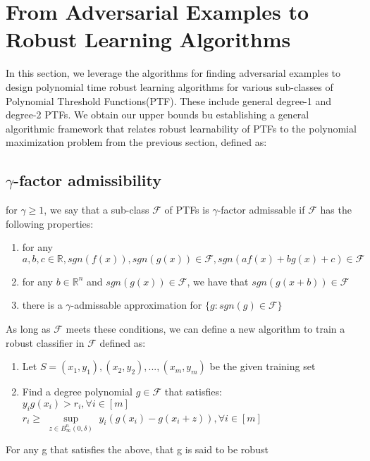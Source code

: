 \documentclass[12pt]{article}
\begin{document}
    \section{From Adversarial Examples to Robust Learning Algorithms}
    In this section, we leverage the algorithms for finding adversarial examples to design polynomial time robust learning algorithms for various sub-classes of Polynomial Threshold Functions(PTF). These include general degree-1 and degree-2 PTFs. We obtain our upper bounds bu establishing a general algorithmic framework that relates robust learnability of PTFs to the polynomial maximization problem from the previous section, defined as:
    
    \subsection{$\gamma$-factor admissibility}
    for $\gamma\ge1$, we say that a sub-class $\mathcal{F}$ of PTFs is $\gamma$-factor admissable if $\mathcal{F}$ has the following properties:
    \begin{enumerate}
        \item for any $a, b, c \in \mathbb{R}, sgn(f(x)), sgn(g(x))\in\mathcal{F}, sgn(af(x)+bg(x)+c)\in\mathcal{F}$
        \item for any $b\in\mathbb{R}^n$ and $sgn(g(x))\in\mathcal{F}$, we have that $sgn(g(x+b))\in\mathcal{F}$
        \item there is a $\gamma$-admissable approximation for $\{g:sgn(g)\in\mathcal{F}\}$
    \end{enumerate}
    
    As long as $\mathcal{F}$ meets these conditions, we can define a new algorithm to train a robust classifier in $\mathcal{F}$ defined as:
    \begin{enumerate}
        \item Let $S=(x_1,y_1), (x_2,y_2),...,(x_m,y_m)$ be the given training set
        \item Find a degree polynomial $g\in\mathcal{F}$ that satisfies: \\ 
        $y_{i}g(x_i)>r_i,\forall i\in [m]$ \\
        $r_i\ge$ \(\sup\limits_{z \in B^{n}_{\infty}(0, \delta)}\) $y_{i}(g(x_{i})-g(x_{i}+z)),\forall i\in [m]$
    \end{enumerate}
    For any g that satisfies the above, that g is said to be robust
\end{document}
